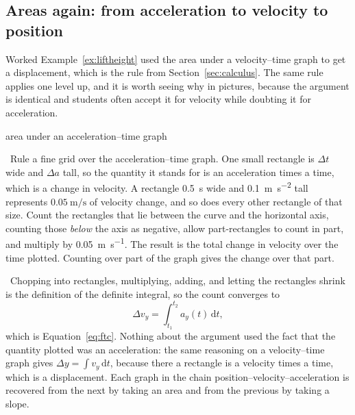 \documentclass[11pt,twoside,openany]{book}
\newcommand{\dd}{\mathrm{d}}
\newcommand{\viewtag}[3]{\fcolorbox{#2}{#3}{\footnotesize\textbf{\textcolor{#2}{#1}}}}
\newcommand{\elemtag}{\viewtag{Elementary}{elemcol}{elempale}}
\newcommand{\calctag}{\viewtag{Calculus}{calccol}{calcpale}}
\newcommand{\elem}{\par\medskip\noindent\elemtag\ }
\newcommand{\calc}{\par\medskip\noindent\calctag\ }
\begin{document}
\subsection{Areas again: from acceleration to velocity to position}

Worked Example~\ref{ex:liftheight} used the area under a velocity--time graph to get a displacement, which is the rule from Section~\ref{sec:calculus}. The same rule applies one level up, and it is worth seeing why in pictures, because the argument is identical and students often accept it for velocity while doubting it for acceleration.

\begin{twoviews}{area under an acceleration--time graph}
\elem Rule a fine grid over the acceleration--time graph. One small rectangle is $\Delta t$ wide and $\Delta a$ tall, so the quantity it stands for is an acceleration times a time, which is a change in velocity. A rectangle \SI{0.5}{\second} wide and \SI{0.1}{\metre\per\second\squared} tall represents $\SI{0.05}{\metre\per\second}$ of velocity change, and so does every other rectangle of that size. Count the rectangles that lie between the curve and the horizontal axis, counting those \emph{below} the axis as negative, allow part-rectangles to count in part, and multiply by \SI{0.05}{\metre\per\second}. The result is the total change in velocity over the time plotted. Counting over part of the graph gives the change over that part.

\calc Chopping into rectangles, multiplying, adding, and letting the rectangles shrink is the definition of the definite integral, so the count converges to
\[
\Delta v_y = \int_{t_1}^{t_2} a_y(t)\,\dd t,
\]
which is Equation~\eqref{eq:ftc}. Nothing about the argument used the fact that the quantity plotted was an acceleration: the same reasoning on a velocity--time graph gives $\Delta y = \int v_y\,\dd t$, because there a rectangle is a velocity times a time, which is a displacement. Each graph in the chain position--velocity--acceleration is recovered from the next by taking an area and from the previous by taking a slope.
\end{twoviews}
\end{document}

